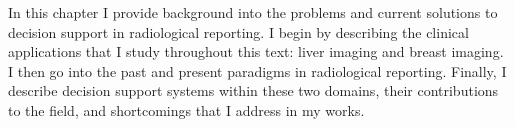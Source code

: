 In this chapter I provide background into the problems and current solutions to decision support in radiological reporting. I begin by describing the clinical applications that I study throughout this text: liver imaging and breast imaging. I then go into the past and present paradigms in radiological reporting. Finally, I describe decision support systems within these two domains, their contributions to the field, and shortcomings that I address in my works.